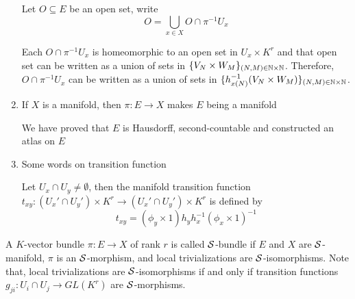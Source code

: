 \begin{proposition}
\begin{longproof}
\begin{enumerate}
			Let $O \subseteq E$ be an open set, write
			$$
			O = \bigcup_{x \in X} O \cap \pi^{-1} U_x
			$$
			
			Each $O \cap \pi^{-1} U_x$ is homeomorphic to an open set in $U_x \times K^r$ and that open set can be written as a union of sets in $\{V_N \times W_M\}_{(N, M) \in \mathbb{N} \times \mathbb{N}}$. Therefore, $O \cap \pi^{-1} U_x$ can be written as a union of sets in $\{h^{-1}_{x(N)} (V_N \times W_M)\}_{(N, M) \in \mathbb{N} \times \mathbb{N}}$.
			
			\item If $X$ is a manifold, then $\pi: E \to X$ makes $E$ being a manifold
			
			We have proved that $E$ is Hausdorff, second-countable and constructed an atlas on $E$
			
			\item Some words on transition function
			
			Let $U_x \cap U_y \neq \emptyset$, then the manifold transition function $t_{xy}: (U_x' \cap U_y') \times K^r \to (U_x' \cap U_y') \times K^r$ is defined by
			$$
			t_{xy} = (\phi_y \times 1) h_y h_x^{-1} (\phi_x \times 1)^{-1}
			$$
			
			\begin{center}
			\end{center}
			
		\end{enumerate}
	\end{longproof}
\end{proposition}


\begin{definition}
	A $K$-vector bundle $\pi: E \to X$ of rank $r$ is called $\mathcal{S}$-bundle if $E$ and $X$ are $\mathcal{S}$-manifold, $\pi$ is an $\mathcal{S}$-morphism, and local trivializations are $\mathcal{S}$-isomorphisms. Note that, local trivializations are $\mathcal{S}$-isomorphisms if and only if transition functions $g_{ji}: U_i \cap U_j \to GL(K^r)$ are $\mathcal{S}$-morphisms.
\end{definition}

